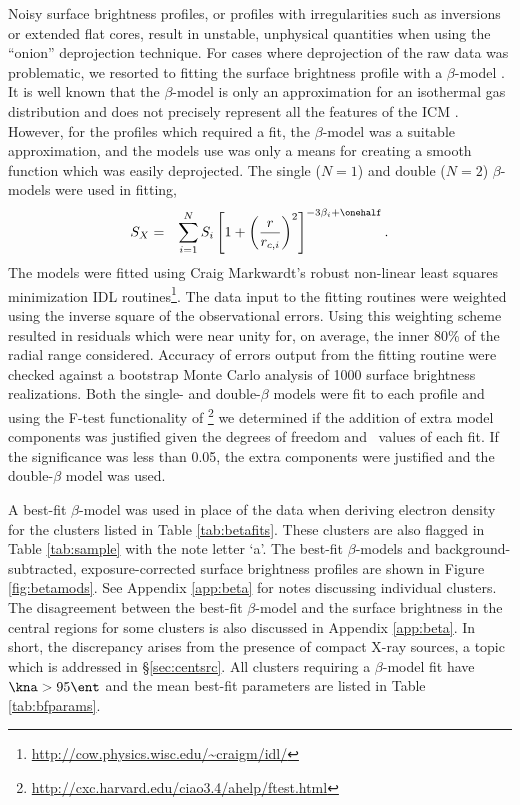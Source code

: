 \documentclass[apj]{emulateapj}
\begin{document}
Noisy surface brightness profiles, or profiles with irregularities
such as inversions or extended flat cores, result in unstable,
unphysical quantities when using the ``onion'' deprojection
technique. For cases where deprojection of the raw data was
problematic, we resorted to fitting the surface brightness profile
with a $\beta$-model \citep{1978A&A....70..677C}. It is well known
that the $\beta$-model is only an approximation for an isothermal gas
distribution and does not precisely represent all the features of the
ICM \citep{2000MNRAS.311..313E, 2002ApJ...579..571L,
2007ApJ...665..911H}. However, for the profiles which required a fit,
the $\beta$-model was a suitable approximation, and the models use was
only a means for creating a smooth function which was easily
deprojected. The single ($N=1$) and double ($N=2$) $\beta$-models were
used in fitting,
\begin{eqnarray}
S_X &=& \displaystyle\sum_{i=1}^N S_i
\left[1+\left(\frac{r}{r_{c,i}}\right)^2\right]^{-3\beta_i+\onehalf}.
\end{eqnarray}
The models were fitted using Craig Markwardt's robust non-linear least
squares minimization IDL
routines\footnote{\url{http://cow.physics.wisc.edu/~craigm/idl/}}. The
data input to the fitting routines were weighted using the inverse
square of the observational errors. Using this weighting scheme
resulted in residuals which were near unity for, on average, the inner
80\% of the radial range considered. Accuracy of errors output from
the fitting routine were checked against a bootstrap Monte Carlo
analysis of 1000 surface brightness realizations. Both the single- and
double-$\beta$ models were fit to each profile and using the F-test
functionality of
\sherpa\footnote{\url{http://cxc.harvard.edu/ciao3.4/ahelp/ftest.html}}
we determined if the addition of extra model components was justified
given the degrees of freedom and \chisq\ values of each fit. If the
significance was less than 0.05, the extra components were justified
and the double-$\beta$ model was used.

A best-fit $\beta$-model was used in place of the data when deriving
electron density for the clusters listed in Table
\ref{tab:betafits}. These clusters are also flagged in Table
\ref{tab:sample} with the note letter `a'. The best-fit $\beta$-models
and background-subtracted, exposure-corrected surface brightness
profiles are shown in Figure \ref{fig:betamods}. See Appendix
\ref{app:beta} for notes discussing individual clusters. The
disagreement between the best-fit $\beta$-model and the surface
brightness in the central regions for some clusters is also discussed
in Appendix \ref{app:beta}. In short, the discrepancy arises from the
presence of compact X-ray sources, a topic which is addressed in
\S\ref{sec:centsrc}. All clusters requiring a $\beta$-model fit have
$\kna > 95 \ent$ and the mean best-fit parameters are listed in Table
\ref{tab:bfparams}.
\end{document}
